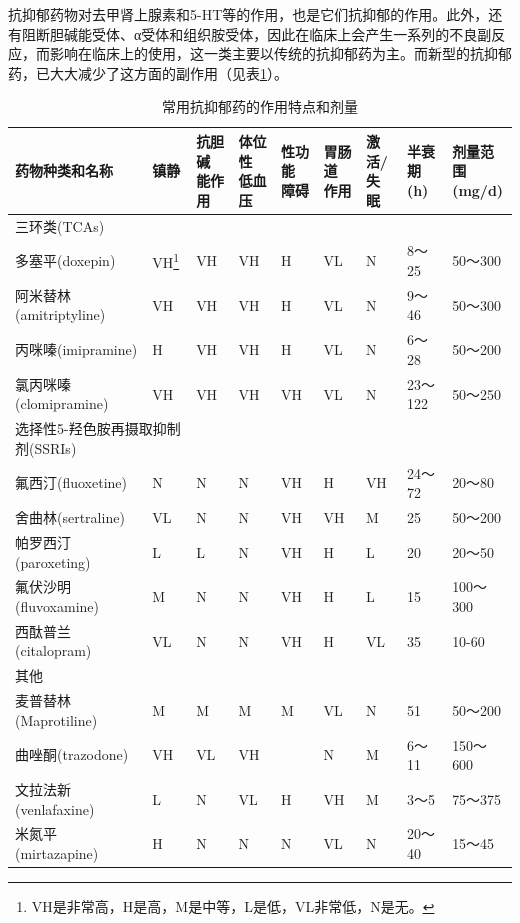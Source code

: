 抗抑郁药物对去甲肾上腺素和5-HT等的作用，也是它们抗抑郁的作用。此外，还有阻断胆碱能受体、α受体和组织胺受体，因此在临床上会产生一系列的不良副反应，而影响在临床上的使用，这一类主要以传统的抗抑郁药为主。而新型的抗抑郁药，已大大减少了这方面的副作用（见表\ref{tab18-3}）。
{\small
\begin{longtable}[]{lllllllll}
    \caption{{\normalsize 常用抗抑郁药的作用特点和剂量}}
    \label{tab18-3}\\
    \toprule
    药物种类和名称&镇静&\tabincell{l}{抗胆碱\\ 能作用}&\tabincell{l}{体位性\\低血压}&\tabincell{l}{性功能\\障碍}&\tabincell{l}{胃肠道\\作用}&\tabincell{l}{激活/\\失眠}&\tabincell{l}{半衰期\\(h)}&\tabincell{l}{剂量范围\\(mg/d)}\\
\midrule
三环类(TCAs)&&&&&&&&\\
\quad 多塞平(doxepin)&VH\footnote{VH是非常高，H是高，M是中等，L是低，VL非常低，N是无。}&VH&VH&H&VL&N&8～25&50～300\\
\quad 阿米替林(amitriptyline)&VH&VH&VH&H& VL& N&9～46&50～300\\
\quad 丙咪嗪(imipramine)&H&VH&VH&H&VL&N&6～28&50～200\\
\quad 氯丙咪嗪(clomipramine)&VH& VH&VH&VH&VL&N&23～122&50～250\\
\multicolumn{2}{l}{选择性5-羟色胺再摄取抑制剂(SSRIs)}&&&&&&&\\
\quad 氟西汀(fluoxetine)&N&N&N& VH &H& VH&24～72&20～80\\
\quad 舍曲林(sertraline)&VL&N&N&VH&VH& M&25&50～200\\
\quad 帕罗西汀(paroxeting)&L&L&N&VH&H&L&20&20～50\\
\quad 氟伏沙明(fluvoxamine)&M&N&N&VH&H&L&15&100～300\\
\quad 西酞普兰(citalopram)&VL&N&N& VH& H& VL& 35& 10-60\\
其他&&&&&&&&\\
\quad 麦普替林(Maprotiline)&M&M&M&M&VL&N&51&50～200\\
\quad 曲唑酮(trazodone)&VH&VL&VH&&N&M&6～11&150～600\\
\quad 文拉法新(venlafaxine)&L&N&VL&H&VH&M&3～5&75～375\\
\quad 米氮平(mirtazapine)&H&N& N&N&VL&N&20～40&15～45\\
\bottomrule
\end{longtable}}

